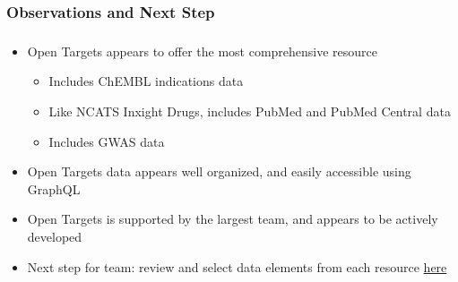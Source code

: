 \documentclass[aspectratio=169,xcolor=dvipsnames]{beamer}
\begin{document}
\begin{frame}[fragile,t]
  \frametitle{Observations and Next Step}
  \frametitle{}
  \framesubtitle{}
  \begin{itemize}
  \item[] Open Targets appears to offer the most comprehensive
    resource
    \begin{itemize}
    \item Includes ChEMBL indications data
    \item Like NCATS Inxight Drugs, includes PubMed and PubMed Central
      data
    \item Includes GWAS data
    \end{itemize}
    \vspace{0.5\baselineskip}
  \item[] Open Targets data appears well organized, and easily
    accessible using GraphQL
    \vspace{0.5\baselineskip}
  \item[] Open Targets is supported by the largest team, and appears
    to be actively developed
    \vspace{0.5\baselineskip}
  \item[] Next step for team: review and select data elements from
    each resource
    \href{https://drive.google.com/drive/u/0/folders/1oWTGj9LLKeqklSrDB97kliZlKHrgdBKo}{here}
  \end{itemize}
\end{frame}




\end{document}
